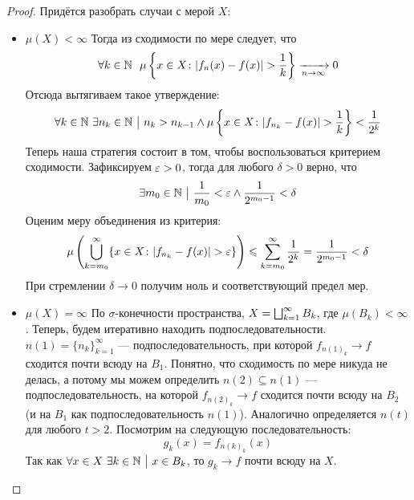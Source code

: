 \begin{proof}
	Придётся разобрать случаи с мерой $X$:
	\begin{itemize}
		\item $\mu(X) < \infty$ Тогда из сходимости по мере следует, что
		\[
			\forall k \in \mathbb{N}\ \ \mu\left\{x \in X \colon |f_n(x) - f(x)| > \frac{1}{k}\right\} \xrightarrow[n \to \infty]{} 0
		\]
		Отсюда вытягиваем такое утверждение:
		\[
			\forall k \in \mathbb{N}\ \exists n_k \in \mathbb{N} \ \big|\  n_k > n_{k - 1} \wedge \mu\left\{x \in X \colon |f_{n_k} - f(x)| > \frac{1}{k}\right\} < \frac{1}{2^k}
		\]
		Теперь наша стратегия состоит в том, чтобы воспользоваться критерием сходимости. Зафиксируем $\varepsilon > 0$, тогда для любого $\delta > 0$ верно, что
		\[
			\exists m_0 \in \mathbb{N} \ \big|\  \frac{1}{m_0} < \varepsilon \wedge \frac{1}{2^{m_0 - 1}} < \delta
		\]
		Оценим меру объединения из критерия:
		\[
			\mu\left(\bigcup_{k = m_0}^\infty \{x \in X \colon |f_{n_k} - f(x)| > \varepsilon\}\right) \leqslant \sum_{k = m_0}^\infty \frac{1}{2^k} = \frac{1}{2^{m_0 - 1}} < \delta
		\]
		При стремлении $\delta \to 0$ получим ноль и соответствующий предел мер.
		
		\item $\mu(X) = \infty$ По $\sigma$-конечности пространства, $X = \bigsqcup_{k = 1}^\infty B_k$, где $\mu(B_k) < \infty$. Теперь, будем итеративно находить подпоследовательности. $n(1) = \{n_k\}_{k = 1}^\infty$ ---  подпоследовательность, при которой $f_{n(1)_k} \to f$ сходится почти всюду на $B_1$. Понятно, что сходимость по мере никуда не делась, а потому мы можем определить $n(2) \subseteq n(1)$ --- подпоследовательность, на которой $f_{n(2)_k} \to f$ сходится почти всюду на $B_2$ (и на $B_1$ как подпоследовательность $n(1)$). Аналогично определяется $n(t)$ для любого $t > 2$. Посмотрим на следующую последовательность:
		\[
			g_k(x) = f_{n(k)_k}(x)
		\]
		Так как $\forall x \in X\ \exists k \in \mathbb{N} \ \big|\  x \in B_k$, то $g_k \to f$ почти всюду на $X$.
	\end{itemize}
\end{proof}